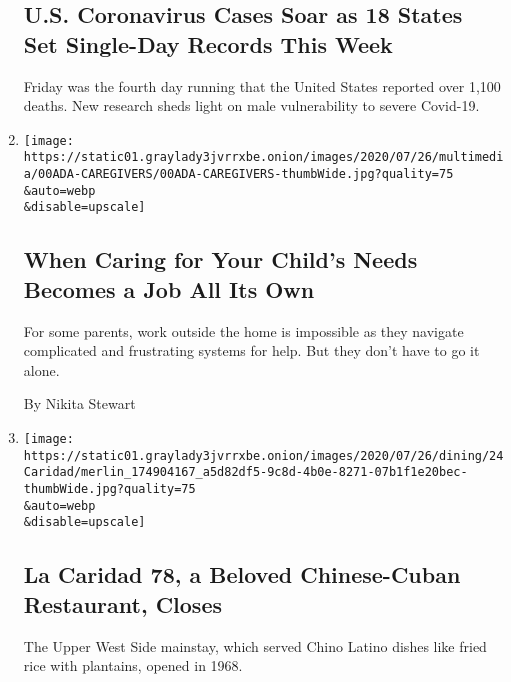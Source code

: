 \begin{enumerate}
  \hypertarget{us-coronavirus-cases-soar-as-18-states-set-single-day-records-this-week}{%
  \subsection{U.S. Coronavirus Cases Soar as 18 States Set Single-Day
  Records This
  Week}\label{us-coronavirus-cases-soar-as-18-states-set-single-day-records-this-week}}

  Friday was the fourth day running that the United States reported over
  1,100 deaths. New research sheds light on male vulnerability to severe
  Covid-19.
\item
  \href{/2020/07/24/us/children-disabilities-parenting-poverty-assistance.html}{}

  \texttt{[image: https://static01.graylady3jvrrxbe.onion/images/2020/07/26/multimedia/00ADA-CAREGIVERS/00ADA-CAREGIVERS-thumbWide.jpg?quality=75\\\&auto=webp\\\&disable=upscale]}

  \hypertarget{when-caring-for-your-childs-needs-becomes-a-job-all-its-own}{%
  \subsection{When Caring for Your Child's Needs Becomes a Job All Its
  Own}\label{when-caring-for-your-childs-needs-becomes-a-job-all-its-own}}

  For some parents, work outside the home is impossible as they navigate
  complicated and frustrating systems for help. But they don't have to
  go it alone.

  By Nikita Stewart
\item
  \href{/2020/07/24/dining/la-caridad-78-closes.html}{}

  \texttt{[image: https://static01.graylady3jvrrxbe.onion/images/2020/07/26/dining/24Caridad/merlin\_174904167\_a5d82df5-9c8d-4b0e-8271-07b1f1e20bec-thumbWide.jpg?quality=75\\\&auto=webp\\\&disable=upscale]}

  \hypertarget{la-caridad-78-a-beloved-chinese-cuban-restaurant-closes}{%
  \subsection{La Caridad 78, a Beloved Chinese-Cuban Restaurant,
  Closes}\label{la-caridad-78-a-beloved-chinese-cuban-restaurant-closes}}

  The Upper West Side mainstay, which served Chino Latino dishes like
  fried rice with plantains, opened in 1968.


\end{enumerate}
